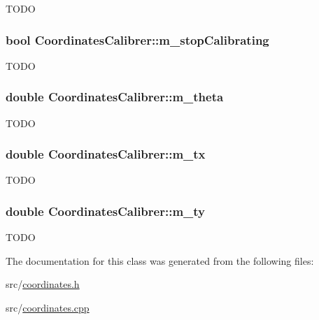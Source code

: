 \label{classCoordinatesCalibrer_af2675b7f9f8612eb53e81a5268501180}
TODO \hypertarget{classCoordinatesCalibrer_ac8da80d736936d73e78f21a7f046855d}{
\subsubsection[{m\_\-stopCalibrating}]{\setlength{\rightskip}{0pt plus 5cm}bool {\bf CoordinatesCalibrer::m\_\-stopCalibrating}}}
\label{classCoordinatesCalibrer_ac8da80d736936d73e78f21a7f046855d}
TODO \hypertarget{classCoordinatesCalibrer_a039975d1cf826afcb960e77f8f957f91}{
\subsubsection[{m\_\-theta}]{\setlength{\rightskip}{0pt plus 5cm}double {\bf CoordinatesCalibrer::m\_\-theta}}}
\label{classCoordinatesCalibrer_a039975d1cf826afcb960e77f8f957f91}
TODO \hypertarget{classCoordinatesCalibrer_ad3dcf12acb15253d8467440ccf917581}{
\subsubsection[{m\_\-tx}]{\setlength{\rightskip}{0pt plus 5cm}double {\bf CoordinatesCalibrer::m\_\-tx}}}
\label{classCoordinatesCalibrer_ad3dcf12acb15253d8467440ccf917581}
TODO \hypertarget{classCoordinatesCalibrer_a7e9c56017cf2f279564f2aba38aa146b}{
\subsubsection[{m\_\-ty}]{\setlength{\rightskip}{0pt plus 5cm}double {\bf CoordinatesCalibrer::m\_\-ty}}}
\label{classCoordinatesCalibrer_a7e9c56017cf2f279564f2aba38aa146b}
TODO 

The documentation for this class was generated from the following files:\begin{DoxyCompactItemize}
\item 
src/\hyperlink{coordinates_8h}{coordinates.h}\item 
src/\hyperlink{coordinates_8cpp}{coordinates.cpp}\end{DoxyCompactItemize}
